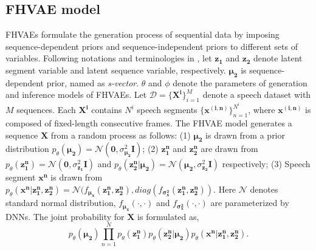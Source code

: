 \documentclass[a4paper]{article}
\begin{document}
\subsection{FHVAE model}
FHVAEs formulate the generation process of sequential data by imposing sequence-dependent priors and sequence-independent priors to different sets of variables. 
Following notations and terminologies in \cite{hsu2017nips}, 
let $\bm{z_1}$ and $\bm{z_2}$ denote latent segment variable and latent sequence variable, respectively. $\bm{\mu_2}$ is sequence-dependent prior, named as \emph{s-vector}. $\theta$ and $\phi$ denote the parameters of generation and inference models of FHVAEs.
Let $\mathcal{D}=\{\bm{X^{i}}\}_{i=1}^{M}$ denote a speech dataset with $M$ sequences. 
Each $\bm{X^i}$ contains $N^i$ speech segments $\{\bm{x^{(i,n)}}\}^{N^i}_{n=1}$, where $\bm{x^{(i,n)}}$ is composed of fixed-length consecutive 
frames. The FHVAE model generates a sequence $\bm{X}$ from a random process as follows: (1) $\bm{\mu_2 }$ is drawn from a prior distribution $p_{\theta}(\bm{\mu_2})=\mathcal{N} (\bm{0},\sigma^2_{\bm{\mu_2}} \bm{I})$; (2) $\bm{z_1 ^{n}} $ and $\bm{z_2^{n}} $ are drawn from $p_{\theta}(\bm{z_1 ^{n}})=\mathcal{N} (\bm{0}, {\sigma^2_{\bm{z_1}}} \bm{I})$ and  $p_{\theta}(\bm{z_2 ^{n}| \bm{\mu_2}})=\mathcal{N}(\bm{\mu_2}, {\sigma^2_{\bm{z_2}}} \bm{I} )$ respectively; (3) Speech segment $\bm{x^{n}}$ is drawn from $p_{\theta}(\bm{x^{n}}|\bm{z_1 ^{n}, \bm{z_2^{n}}})=\mathcal{N}(f_{\bm{\mu_x}} (\bm{z_1 ^{n}}, \bm{z_2^{n}}), diag(f_{\bm{\sigma^2_x}} (\bm{z_1 ^{n}}, \bm{z_2^{n}}))$. Here $\mathcal{N}$ denotes standard normal distribution, $ f_{\bm{\mu_x}} (\cdot, \cdot)$ and $ f_{\bm{\sigma^2_x}} (\cdot, \cdot)$ are parameterized by DNNs.
The joint probability for $\bm{X}$ is formulated as,
\begin{equation}
    p_{\theta} (\bm{\mu_2})\prod_{n=1}^{N} p_{\theta} (\bm{z_1^n}) p_{\theta} (\bm{z_2^{n}}|\bm{\mu_2})p_{\theta} (\bm{x^n}|\bm{z_1 ^{n}, \bm{z_2^{n}}}).
\end{equation}
\end{document}
